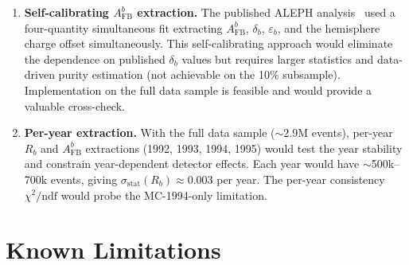 \documentclass[11pt,a4paper]{article}
\begin{document}
\begin{enumerate}
\item \textbf{Self-calibrating $A_\text{FB}^b$ extraction.}
  The published ALEPH analysis~\cite{ALEPH:AFBb} used a
  four-quantity simultaneous fit extracting $A_\text{FB}^b$,
  $\delta_b$, $\varepsilon_b$, and the hemisphere charge offset
  simultaneously.
  This self-calibrating approach would eliminate the dependence
  on published $\delta_b$ values but requires larger statistics
  and data-driven purity estimation (not achievable on the 10\%
  subsample).
  Implementation on the full data sample is feasible and would
  provide a valuable cross-check.

\item \textbf{Per-year extraction.}
  With the full data sample ($\sim$2.9M events), per-year
  $R_b$ and $A_\text{FB}^b$ extractions (1992, 1993, 1994, 1995)
  would test the year stability and constrain year-dependent
  detector effects.
  Each year would have $\sim$500k--700k events, giving
  $\sigma_\text{stat}(R_b) \approx 0.003$ per year.
  The per-year consistency $\chi^2/\text{ndf}$ would probe
  the MC-1994-only limitation.
\end{enumerate}

\section{Known Limitations}
\label{sec:limitations}
\end{document}
